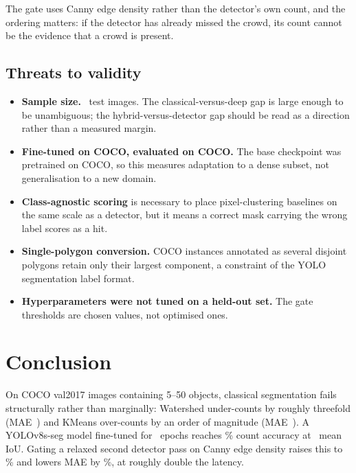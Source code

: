 \documentclass[12pt, a4paper]{article}
\begin{document}
The gate uses Canny edge density rather than the detector's own count, and the
ordering matters: if the detector has already missed the crowd, its count
cannot be the evidence that a crowd is present.

\subsection{Threats to validity}

\begin{itemize}
  \item \textbf{Sample size.}  \nTest\ test images.  The classical-versus-deep
        gap is large enough to be unambiguous; the hybrid-versus-detector gap
        should be read as a direction rather than a measured margin.
  \item \textbf{Fine-tuned on COCO, evaluated on COCO.}  The base checkpoint
        was pretrained on COCO, so this measures adaptation to a dense subset,
        not generalisation to a new domain.
  \item \textbf{Class-agnostic scoring} is necessary to place pixel-clustering
        baselines on the same scale as a detector, but it means a correct mask
        carrying the wrong label scores as a hit.
  \item \textbf{Single-polygon conversion.}  COCO instances annotated as
        several disjoint polygons retain only their largest component, a
        constraint of the YOLO segmentation label format.
  \item \textbf{Hyperparameters were not tuned on a held-out set.}  The gate
        thresholds are chosen values, not optimised ones.
\end{itemize}

\section{Conclusion}

On COCO val2017 images containing 5--50 objects, classical segmentation fails
structurally rather than marginally: Watershed under-counts by roughly
threefold (MAE~\WsMae) and KMeans over-counts by an order of magnitude
(MAE~\KmMae).  A YOLOv8s-seg model fine-tuned for \trainEpochs\ epochs reaches
\YoAcc\% count accuracy at \YoIoU\ mean IoU.  Gating a relaxed second detector
pass on Canny edge density raises this to \HyAcc\% and lowers MAE by
\maeDrop\%, at roughly double the latency.
\end{document}
